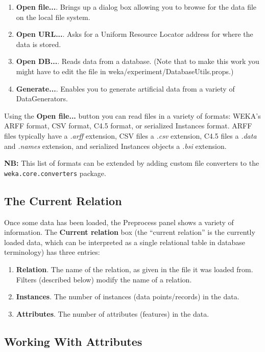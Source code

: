 \documentclass[a4paper]{article}
\begin{document}
\begin{enumerate}
\item \textbf{Open file...}.
Brings up a dialog box allowing you to browse for the data file on the local
file system.
\item \textbf{Open URL...}.
Asks for a Uniform Resource Locator address for where the data is stored.
\item \textbf{Open DB...}.  Reads data from a database. (Note that to
make this work you might have to edit the file in
weka/experiment/DatabaseUtils.props.)
\item \textbf{Generate...}.  Enables you to generate artificial data
from a variety of DataGenerators.
\end{enumerate}
\noindent
Using the \textbf{Open file...} button you can read files in a variety
of formats: WEKA's ARFF format, CSV format, C4.5 format, or serialized
Instances format. ARFF files typically have a {\em .arff\/}
extension, CSV files a {\em .csv\/} extension, C4.5 files a {\em
.data\/} and {\em .names\/} extension, and serialized Instances
objects a {\em .bsi\/} extension. 

\textbf{NB:} This list of formats can be extended by adding custom file 
converters to the \texttt{weka.core.converters} package.

\subsection{The Current Relation}

Once some data has been loaded, the Preprocess panel shows a variety
of information.  The \textbf{Current relation} box (the ``current
relation'' is the currently loaded data, which can be interpreted as a
single relational table in database terminology)  has three entries:

\begin{enumerate}
\item \textbf{Relation}.
The name of the relation, as given in the file it was loaded from. Filters
(described below) modify the name of a relation. 
\item \textbf{Instances}.
The number of instances (data points/records) in the data.
\item \textbf{Attributes}.
The number of attributes (features) in the data.
\end{enumerate}

\subsection{Working With Attributes}
\end{document}
